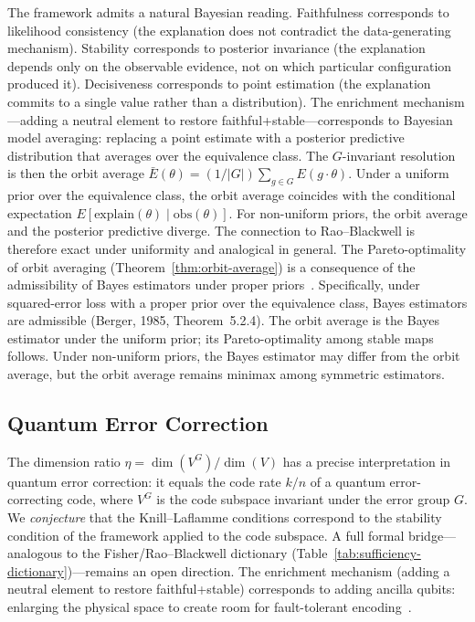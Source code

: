 \documentclass[11pt,a4paper]{article}
\begin{document}
The framework admits a natural Bayesian reading.  Faithfulness corresponds to likelihood consistency (the explanation does not contradict the data-generating mechanism).  Stability corresponds to posterior invariance (the explanation depends only on the observable evidence, not on which particular configuration produced it).  Decisiveness corresponds to point estimation (the explanation commits to a single value rather than a distribution).  The enrichment mechanism---adding a neutral element to restore faithful+stable---corresponds to Bayesian model averaging: replacing a point estimate with a posterior predictive distribution that averages over the equivalence class.  The $G$-invariant resolution is then the orbit average $\bar{E}(\theta) = (1/|G|) \sum_{g \in G} E(g \cdot \theta)$.  Under a uniform prior over the equivalence class, the orbit average coincides with the conditional expectation $E[\mathrm{explain}(\theta) \mid \mathrm{obs}(\theta)]$. For non-uniform priors, the orbit average and the posterior predictive diverge. The connection to Rao--Blackwell is therefore exact under uniformity and analogical in general.  The Pareto-optimality of orbit averaging (Theorem~\ref{thm:orbit-average}) is a consequence of the admissibility of Bayes estimators under proper priors~\citep{berger1985statistical}.  Specifically, under squared-error loss with a proper prior over the equivalence class, Bayes estimators are admissible (Berger, 1985, Theorem~5.2.4). The orbit average is the Bayes estimator under the uniform prior; its Pareto-optimality among stable maps follows. Under non-uniform priors, the Bayes estimator may differ from the orbit average, but the orbit average remains minimax among symmetric estimators.

\subsection{Quantum Error Correction}
\label{sec:bridge-qec}

The dimension ratio $\eta = \dim(V^G)/\dim(V)$ has a precise interpretation in quantum error correction: it equals the code rate $k/n$ of a quantum error-correcting code, where $V^G$ is the code subspace invariant under the error group $G$.  We \emph{conjecture} that the Knill--Laflamme conditions correspond to the stability condition of the framework applied to the code subspace.  A full formal bridge---analogous to the Fisher/Rao--Blackwell dictionary (Table~\ref{tab:sufficiency-dictionary})---remains an open direction.  The enrichment mechanism (adding a neutral element to restore faithful+stable) corresponds to adding ancilla qubits: enlarging the physical space to create room for fault-tolerant encoding~\citep{knill1997theory}.
\end{document}
